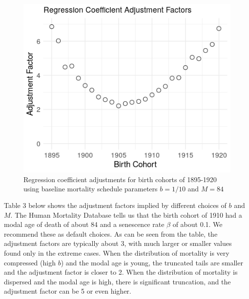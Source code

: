 \documentclass[
  11pt,
]{article}
\begin{document}
\begin{figure}[H]
  \centering
  \includegraphics[width=6in]{../illustrations/regression_coefficient_adjustment.png}
  \caption{Regression coefficient adjustments for birth cohorts of 1895-1920 using baseline mortality schedule parameters $b = 1/10$ and $M = 84$}
  \label{fig:regression_coeff}
\end{figure}

Table 3 below shows the adjustment factors implied by different choices
of \(b\) and \(M\). The Human Mortality Database tells us that the birth
cohort of 1910 had a modal age of death of about 84 and a senescence
rate \(\beta\) of about 0.1. We recommend these as default choices. As
can be seen from the table, the adjustment factors are typically about
3, with much larger or smaller values found only in the extreme cases.
When the distribution of mortality is very compressed (high \(b\)) and
the modal age is young, the truncated tails are smaller and the
adjustment factor is closer to 2. When the distribution of mortality is
dispersed and the modal age is high, there is significant truncation,
and the adjustment factor can be 5 or even higher.
\end{document}
